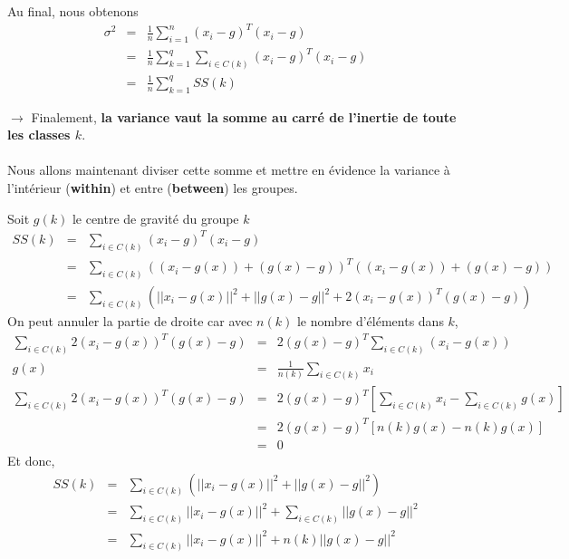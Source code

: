 \documentclass[a4paper, 11pt, onecolumn]{article}
\begin{document}
\begin{enumerate}
\begin{framed}
Au final, nous obtenons
\begin{eqnarray}
\sigma^2 &=& \frac{1}{n}\sum_{i=1}^n (x_i-g)^T(x_i-g)\\
&=& \frac{1}{n}\sum_{k=1}^q\sum_{i\in C(k)} (x_i-g)^T(x_i-g)\\
&=& \frac{1}{n}\sum_{k=1}^q SS(k)
\end{eqnarray}
\end{framed}

$\rightarrow$ Finalement, \textbf{la variance vaut la somme au carré de l'inertie
de toute les classes $k$}.
\paragraph{}
Nous allons maintenant diviser cette somme et mettre en évidence la variance à l'intérieur 
(\textbf{within}) et entre (\textbf{between}) les groupes.

\begin{framed}
Soit $g(k)$ le centre de gravité du groupe $k$
\begin{eqnarray}
SS(k) &=& \sum_{i\in C(k)} (x_i-g)^T(x_i-g)\\
&=& \sum_{i\in C(k)} ((x_i-g(x))+(g(x)-g))^T((x_i-g(x))+(g(x)-g))\\
&=& \sum_{i\in C(k)} (||x_i-g(x)||^2 + ||g(x)-g||^2 + 2(x_i-g(x))^T(g(x)-g))
\end{eqnarray}
On peut annuler la partie de droite car avec $n(k)$ le nombre d'éléments dans $k$,
\begin{eqnarray}
\sum_{i\in C(k)} 2(x_i-g(x))^T(g(x)-g) &=& 2(g(x)-g)^T\sum_{i\in C(k)} (x_i-g(x))\\
g(x) &=& \frac{1}{n(k)} \sum_{i\in C(k)} x_i\\
\sum_{i\in C(k)} 2(x_i-g(x))^T(g(x)-g) &=& 2(g(x)-g)^T\left[\sum_{i\in C(k)} x_i- \sum_{i\in C(k)} g(x)\right]\\
&=& 2(g(x)-g)^T\left[n(k)g(x)- n(k)g(x)\right]\\
&=& 0
\end{eqnarray}
Et donc,
\begin{eqnarray}
SS(k) &=& \sum_{i\in C(k)} (||x_i-g(x)||^2 + ||g(x)-g||^2)\\
&=& \sum_{i\in C(k)} ||x_i-g(x)||^2 + \sum_{i\in C(k)} ||g(x)-g||^2\\
&=& \sum_{i\in C(k)} ||x_i-g(x)||^2 + n(k) ||g(x)-g||^2\\
\end{eqnarray}
\end{framed}


\end{enumerate}
\end{document}
